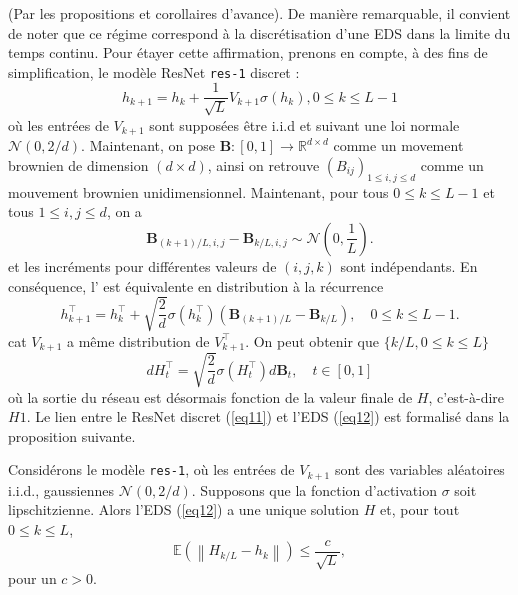 (Par les propositions et corollaires d'avance). De manière remarquable, il convient de noter que ce régime correspond à la discrétisation d'une EDS dans la limite du temps continu. Pour étayer cette affirmation, prenons en compte, à des fins de simplification, le modèle ResNet \texttt{res-1} discret :
\begin{equation}\label{eq11}
    h_{k+1} = h_k + \frac{1}{\sqrt{L}}V_{k+1}\sigma(h_k) , 0 \leqslant k \leqslant L-1 
\end{equation}
où les entrées de $V_{k+1}$ sont supposées être i.i.d et suivant une loi normale $\mathcal{N}(0,2/d)$.
Maintenant, on pose $\mathbf{B}:[0,1] \rightarrow \mathbb{R}^{d \times d}$ comme un movement brownien de dimension $ (d \times d) $, ainsi on retrouve $\left(B_{i j}\right)_{1 \leqslant i, j \leqslant d}$ comme un mouvement brownien unidimensionnel. Maintenant, pour tous $0 \leqslant k \leqslant L-1$ et tous $1 \leqslant i, j \leqslant d$, on a
$$
    \mathbf{B}_{(k+1) / L, i, j}-\mathbf{B}_{k / L, i, j} \sim \mathcal{N}\left(0, \frac{1}{L}\right).
$$
et les incréments pour différentes valeurs de $(i, j, k)$ sont indépendants. En conséquence, l' est équivalente en distribution à la récurrence
$$
    h_{k+1}^{\top}=h_k^{\top}+\sqrt{\frac{2}{d}} \sigma\left(h_k^{\top}\right)\left(\mathbf{B}_{(k+1) / L}-\mathbf{B}_{k / L}\right), \quad 0 \leqslant k \leqslant L-1 .
$$
cat $V_{k+1}$ a même distribution de $V_{k+1}^{\top}$. On peut obtenir que $\{k / L, 0 \leqslant k \leqslant L\}$ 
\begin{equation}\label{eq12}
    d H_t^{\top}=\sqrt{\frac{2}{d}} \sigma\left(H_t^{\top}\right) d \mathbf{B}_t, \quad t \in[0,1]
\end{equation}
où la sortie du réseau est désormais fonction de la valeur finale de $H$, c'est-à-dire $H1$. Le lien entre le ResNet discret (\ref{eq11}) et l'EDS (\ref{eq12}) est formalisé dans la proposition suivante.

\begin{proposition}\label{prop10}
    Considérons le modèle \texttt{res-1}, où les entrées de $V_{k+1}$ sont des variables aléatoires i.i.d., gaussiennes $\mathcal{N}(0,2 / d)$. Supposons que la fonction d'activation $\sigma$ soit lipschitzienne. Alors l'EDS (\ref{eq12}) a une unique solution $H$ et, pour tout $0 \leqslant k \leqslant L$,
    $$
        \mathbb{E}\left(\left\|H_{k / L}-h_k\right\|\right) \leqslant \frac{c}{\sqrt{L}},
    $$
    pour un $c>0$.
\end{proposition}

